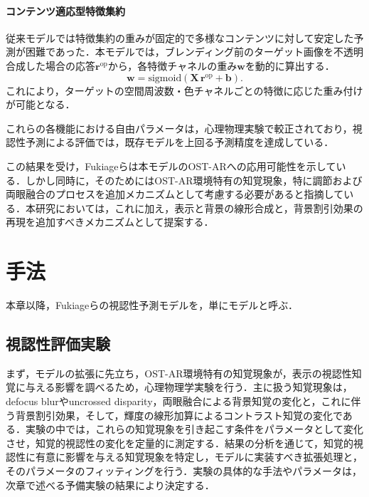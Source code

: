 \documentclass[a4j,10pt,fleqn]{rinkoj}
\begin{document}
\paragraph{コンテンツ適応型特徴集約}
従来モデルでは特徴集約の重みが固定的で多様なコンテンツに対して安定した予測が困難であった．本モデルでは，ブレンディング前のターゲット画像を不透明合成した場合の応答$\mathbf{r}^{\mathrm{op}}$から，各特徴チャネルの重み$\mathbf{w}$を動的に算出する．
\begin{equation}
\mathbf{w} = \mathrm{sigmoid}\!\left(\mathbf{X}\,\mathbf{r}^{\mathrm{op}} + \mathbf{b}\right).
\label{eq:adaptive_weight}
\end{equation}
これにより，ターゲットの空間周波数・色チャネルごとの特徴に応じた重み付けが可能となる．

これらの各機能における自由パラメータは，心理物理実験で較正されており，視認性予測による評価では，既存モデルを上回る予測精度を達成している\cite{Fukiage2023Contentadap}．

この結果を受け，Fukiageらは本モデルのOST-ARへの応用可能性を示している．しかし同時に，そのためにはOST-AR環境特有の知覚現象，特に調節および両眼融合のプロセスを追加メカニズムとして考慮する必要があると指摘している\cite{Fukiage2023Contentadap}．本研究においては，これに加え，表示と背景の線形合成と，背景割引効果\cite{Chapiro2024ARDAVID}の再現を追加すべきメカニズムとして提案する．

\section{手法}
本章以降，Fukiageらの視認性予測モデル\cite{Fukiage2023Contentadap}を，単にモデルと呼ぶ．

\subsection{視認性評価実験}\label{subsec:hvs_exp}
まず，モデルの拡張に先立ち，OST-AR環境特有の知覚現象が，表示の視認性知覚に与える影響を調べるため，心理物理学実験を行う．主に扱う知覚現象は，defocus blurやuncrossed disparity，両眼融合による背景知覚の変化と，これに伴う背景割引効果，そして，輝度の線形加算によるコントラスト知覚の変化である．実験の中では，これらの知覚現象を引き起こす条件をパラメータとして変化させ，知覚的視認性の変化を定量的に測定する．結果の分析を通じて，知覚的視認性に有意に影響を与える知覚現象を特定し，モデルに実装すべき拡張処理と，そのパラメータのフィッティングを行う．実験の具体的な手法やパラメータは，次章で述べる予備実験の結果により決定する．
\end{document}
